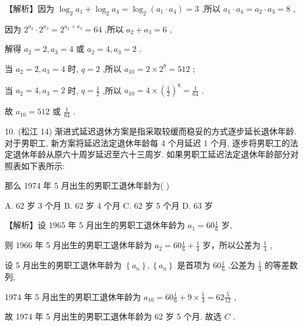 \documentclass[10pt]{article}
\begin{document}
【解析】因为 \({\log }_{2}{a}_{1} + {\log }_{2}{a}_{4} = {\log }_{2}\left( {{a}_{1} \cdot  {a}_{4}}\right)  = 3\) ,所以 \({a}_{1} \cdot  {a}_{4} = {a}_{2} \cdot  {a}_{3} = 8\) ,

因为 \({2}^{{a}_{2}} \cdot  {2}^{{a}_{3}} = {2}^{{a}_{2} + {a}_{3}} = {64}\) ,所以 \({a}_{2} + {a}_{3} = 6\) ,

解得 \({a}_{2} = 2,{a}_{3} = 4\) 或 \({a}_{2} = 4,{a}_{3} = 2\) .

当 \({a}_{2} = 2,{a}_{3} = 4\) 时, \(q = 2\) ,所以 \({a}_{10} = 2 \times  {2}^{8} = {512}\) ;

当 \({a}_{2} = 4,{a}_{3} = 2\) 时, \(q = \frac{1}{2}\) ,所以 \({a}_{10} = 4 \times  {\left( \frac{1}{2}\right) }^{8} = \frac{1}{64}\) .

故 \({a}_{10} = {512}\) 或 \(\frac{1}{64}\) .

10. (松江 14) 渐进式延迟退休方案是指采取较缓而稳妥的方式逐步延长退休年龄. 对于男职工, 新方案将延迟法定退休年龄每 4 个月延迟 1 个月, 逐步将男职工的法定退休年龄从原六十周岁延迟至六十三周岁. 如果男职工延迟法定退休年龄部分对照表如下表所示:

\begin{center}
\end{center}

那么 1974 年 5 月出生的男职工退休年龄为( )

A. 62 岁 3 个月 B. 62 岁 4 个月 C. 62 岁 5 个月 D. 63 岁

【解析】设 1965 年 5 月出生的男职工退休年龄为 \({a}_{1} = {60}\frac{1}{6}\) 岁,

则 1966 年 5 月出生的男职工退休年龄为 \({a}_{2} = {60}\frac{1}{6} + \frac{1}{4}\) 岁，所以公差为 \(\frac{1}{4}\) ,

设 5 月出生的男职工退休年龄为 \(\left\{  {a}_{n}\right\}  ,\left\{  {a}_{n}\right\}\) 是首项为 \({60}\frac{1}{6}\) ,公差为 \(\frac{1}{4}\) 的等差数列,

1974 年 5 月出生的男职工退休年龄为 \({a}_{10} = {60}\frac{1}{6} + 9 \times  \frac{1}{4} = {62}\frac{5}{12}\) ,

故 1974 年 5 月出生的男职工退休年龄为 62 岁 5 个月. 故选 \(C\) .
\end{document}
